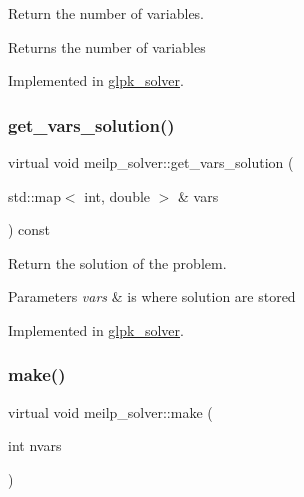 Return the number of variables. 

\begin{DoxyReturn}{Returns}
the number of variables 
\end{DoxyReturn}


Implemented in \hyperlink{classglpk__solver_a331a217a8d51011ad68bfd97c6844778}{glpk\+\_\+solver}.

\mbox{\label{classmeilp__solver_a2d89a5dd8ecf6e2e9dc290f7088f05e9}} 
\subsubsection{\texorpdfstring{get\+\_\+vars\+\_\+solution()}{get\_vars\_solution()}}
{\footnotesize\ttfamily virtual void meilp\+\_\+solver\+::get\+\_\+vars\+\_\+solution (\begin{DoxyParamCaption}\item[{std\+::map$<$ int, double $>$ \&}]{vars }\end{DoxyParamCaption}) const\hspace{0.3cm}{\ttfamily [pure virtual]}}



Return the solution of the problem. 


\begin{DoxyParams}{Parameters}
{\em vars} & is where solution are stored \\
\hline
\end{DoxyParams}


Implemented in \hyperlink{classglpk__solver_a7164da0eb8d9fed8b7cefe548b2f6ee3}{glpk\+\_\+solver}.

\mbox{\label{classmeilp__solver_a8cde2beaa61da22aaec664f3f9a0d253}} 
\subsubsection{\texorpdfstring{make()}{make()}}
{\footnotesize\ttfamily virtual void meilp\+\_\+solver\+::make (\begin{DoxyParamCaption}\item[{int}]{nvars }\end{DoxyParamCaption})\hspace{0.3cm}{\ttfamily [pure virtual]}}



